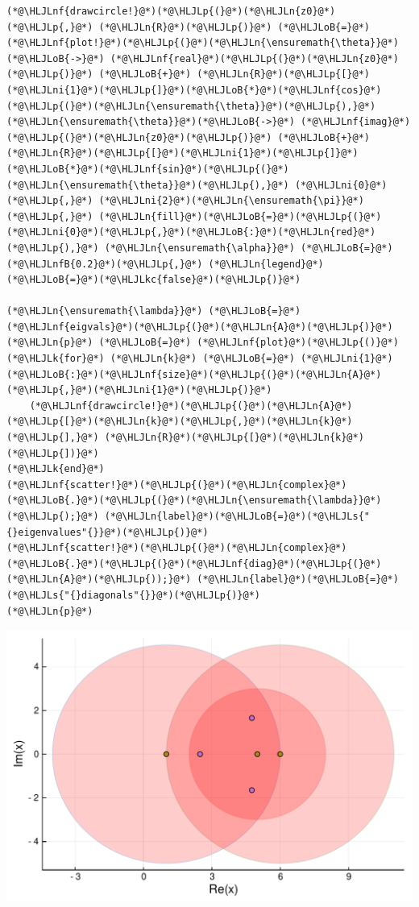 \documentclass[12pt,a4paper]{article}
\newcommand{\HLJLk}[1]{\textcolor[RGB]{148,91,176}{\textbf{#1}}}
\newcommand{\HLJLkc}[1]{\textcolor[RGB]{59,151,46}{\textit{#1}}}
\newcommand{\HLJLn}[1]{#1}
\newcommand{\HLJLnf}[1]{\textcolor[RGB]{66,102,213}{#1}}
\newcommand{\HLJLs}[1]{\textcolor[RGB]{201,61,57}{#1}}
\newcommand{\HLJLnfB}[1]{\textcolor[RGB]{59,151,46}{#1}}
\newcommand{\HLJLni}[1]{\textcolor[RGB]{59,151,46}{#1}}
\newcommand{\HLJLoB}[1]{\textcolor[RGB]{102,102,102}{\textbf{#1}}}
\newcommand{\HLJLp}[1]{#1}
\begin{document}
\begin{lstlisting}
(*@\HLJLnf{drawcircle!}@*)(*@\HLJLp{(}@*)(*@\HLJLn{z0}@*)(*@\HLJLp{,}@*) (*@\HLJLn{R}@*)(*@\HLJLp{)}@*) (*@\HLJLoB{=}@*) (*@\HLJLnf{plot!}@*)(*@\HLJLp{(}@*)(*@\HLJLn{\ensuremath{\theta}}@*)(*@\HLJLoB{->}@*) (*@\HLJLnf{real}@*)(*@\HLJLp{(}@*)(*@\HLJLn{z0}@*)(*@\HLJLp{)}@*) (*@\HLJLoB{+}@*) (*@\HLJLn{R}@*)(*@\HLJLp{[}@*)(*@\HLJLni{1}@*)(*@\HLJLp{]}@*)(*@\HLJLoB{*}@*)(*@\HLJLnf{cos}@*)(*@\HLJLp{(}@*)(*@\HLJLn{\ensuremath{\theta}}@*)(*@\HLJLp{),}@*) (*@\HLJLn{\ensuremath{\theta}}@*)(*@\HLJLoB{->}@*) (*@\HLJLnf{imag}@*)(*@\HLJLp{(}@*)(*@\HLJLn{z0}@*)(*@\HLJLp{)}@*) (*@\HLJLoB{+}@*) (*@\HLJLn{R}@*)(*@\HLJLp{[}@*)(*@\HLJLni{1}@*)(*@\HLJLp{]}@*)(*@\HLJLoB{*}@*)(*@\HLJLnf{sin}@*)(*@\HLJLp{(}@*)(*@\HLJLn{\ensuremath{\theta}}@*)(*@\HLJLp{),}@*) (*@\HLJLni{0}@*)(*@\HLJLp{,}@*) (*@\HLJLni{2}@*)(*@\HLJLn{\ensuremath{\pi}}@*)(*@\HLJLp{,}@*) (*@\HLJLn{fill}@*)(*@\HLJLoB{=}@*)(*@\HLJLp{(}@*)(*@\HLJLni{0}@*)(*@\HLJLp{,}@*)(*@\HLJLoB{:}@*)(*@\HLJLn{red}@*)(*@\HLJLp{),}@*) (*@\HLJLn{\ensuremath{\alpha}}@*) (*@\HLJLoB{=}@*) (*@\HLJLnfB{0.2}@*)(*@\HLJLp{,}@*) (*@\HLJLn{legend}@*)(*@\HLJLoB{=}@*)(*@\HLJLkc{false}@*)(*@\HLJLp{)}@*)

(*@\HLJLn{\ensuremath{\lambda}}@*) (*@\HLJLoB{=}@*) (*@\HLJLnf{eigvals}@*)(*@\HLJLp{(}@*)(*@\HLJLn{A}@*)(*@\HLJLp{)}@*)
(*@\HLJLn{p}@*) (*@\HLJLoB{=}@*) (*@\HLJLnf{plot}@*)(*@\HLJLp{()}@*)
(*@\HLJLk{for}@*) (*@\HLJLn{k}@*) (*@\HLJLoB{=}@*) (*@\HLJLni{1}@*)(*@\HLJLoB{:}@*)(*@\HLJLnf{size}@*)(*@\HLJLp{(}@*)(*@\HLJLn{A}@*)(*@\HLJLp{,}@*)(*@\HLJLni{1}@*)(*@\HLJLp{)}@*)
    (*@\HLJLnf{drawcircle!}@*)(*@\HLJLp{(}@*)(*@\HLJLn{A}@*)(*@\HLJLp{[}@*)(*@\HLJLn{k}@*)(*@\HLJLp{,}@*)(*@\HLJLn{k}@*)(*@\HLJLp{],}@*) (*@\HLJLn{R}@*)(*@\HLJLp{[}@*)(*@\HLJLn{k}@*)(*@\HLJLp{])}@*)
(*@\HLJLk{end}@*)
(*@\HLJLnf{scatter!}@*)(*@\HLJLp{(}@*)(*@\HLJLn{complex}@*)(*@\HLJLoB{.}@*)(*@\HLJLp{(}@*)(*@\HLJLn{\ensuremath{\lambda}}@*)(*@\HLJLp{);}@*) (*@\HLJLn{label}@*)(*@\HLJLoB{=}@*)(*@\HLJLs{"{}eigenvalues"{}}@*)(*@\HLJLp{)}@*)
(*@\HLJLnf{scatter!}@*)(*@\HLJLp{(}@*)(*@\HLJLn{complex}@*)(*@\HLJLoB{.}@*)(*@\HLJLp{(}@*)(*@\HLJLnf{diag}@*)(*@\HLJLp{(}@*)(*@\HLJLn{A}@*)(*@\HLJLp{));}@*) (*@\HLJLn{label}@*)(*@\HLJLoB{=}@*)(*@\HLJLs{"{}diagonals"{}}@*)(*@\HLJLp{)}@*)
(*@\HLJLn{p}@*)
\end{lstlisting}

\includegraphics[width=\linewidth]{figures/Lecture8_3_1.pdf}
\end{document}
